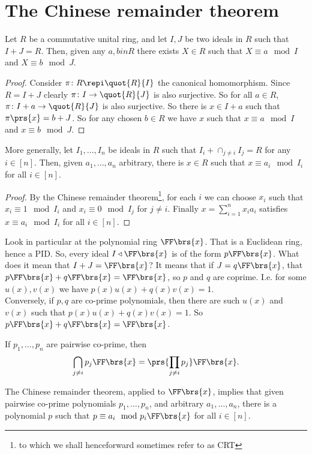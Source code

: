\documentclass[10pt,a4paper,twoside,openany,hidelinks]{book}
\begin{document}
\section{The Chinese remainder theorem}
\begin{theorem}
Let $R$ be a commutative unital ring, and let $I,J$ be two ideals in $R$ such that $I+J = R$. Then, given any $a,b in R$ there exists $X \in R$ such that $X \equiv a\mod{I}$ and $X \equiv b\mod{J}$.
\end{theorem}
\begin{proof}
Consider $\pi \colon R \repi \quot{R}{I}$ the canonical homomorphism.
Since $R = I+J$ clearly $\pi \colon I \to \quot{R}{J}$ is also surjective. So for all $a \in R$, $\pi \colon I+a \to \quot{R}{J}$ is also surjective. So there is $x \in I+a$ such that $\pi\prs{x} = b+J$. So for any chosen $b \in R$ we have $x$ such that $x \equiv a\mod{I}$ and $x \equiv b \mod{J}$.
\end{proof}
\begin{theorem}
More generally, let $I_1, \ldots, I_n$ be ideals in $R$ such that $I_i + \cap_{j \neq i} I_j = R$ for any $i \in [n]$. Then, given $a_1, \ldots, a_n$ arbitrary, there is $x \in R$ such that $x \equiv a_i \mod{I_i}$ for all $i \in [n]$.
\end{theorem}
\begin{proof}
By the Chinese remainder theorem\footnote{to which we shall henceforward sometimes refer to as CRT}, for each $i$ we can choose $x_i$ such that $x_i \equiv 1 \mod{I_i}$ and $x_i \equiv 0 \mod{I_j}$ for $j \neq i$.
Finally $x = \sum_{i=1}^n x_i a_i$ satisfies $x \equiv a_i \mod{I_i}$ for all $i \in [n]$.
\end{proof}
\begin{example}
Look in particular at the polynomial ring $\FF\brs{x}$. That is a Euclidean ring, hence a PID. So, every ideal $I \triangleleft \FF\brs{x}$ is of the form $p \FF\brs{x}$. What does it mean that $I+J = \FF\brs{x}$? It means that if $J = q\FF\brs{x}$, that $p\FF\brs{x} + q\FF\brs{x} = \FF\brs{x}$, so $p$ and $q$ are coprime. I.e. for some $u(x),v(x)$ we have $p(x)u(x) + q(x)v(x) = 1$. \\
Conversely, if $p,q$ are co-prime polynomials, then there are such $u(x)$ and $v(x)$ such that $p(x)u(x) + q(x)v(x) = 1$. So $p\FF\brs{x} + q\FF\brs{x} = \FF\brs{x}$.
\end{example}
\begin{remark}
If $p_1, \ldots, p_n$ are pairwise co-prime, then
\[\bigcap_{j\neq i} p_j \FF\brs{x} = \prs{\prod_{j\neq i}p_j}\FF\brs{x}\text{.}\]
\end{remark}
\begin{conclusion}
The Chinese remainder theorem, applied to $\FF\brs{x}$, implies that given pairwise co-prime polynomials $p_1, \ldots, p_n$, and arbitrary $a_1, \ldots, a_n$, there is a polynomial $p$ such that $p \equiv a_i \mod{p_i \FF\brs{x}}$ for all $i \in [n]$.
\end{conclusion}
\end{document}
